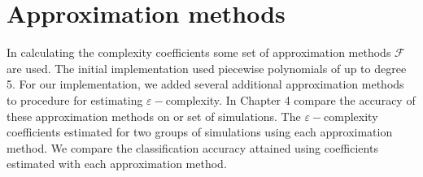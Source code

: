 
  



\section{Approximation methods}

In calculating the complexity coefficients some set 
of approximation methods $\mathcal{F}$ are used.
The initial implementation used piecewise polynomials of
up to degree 5. 
For our implementation, we added several additional 
approximation methods to procedure for 
estimating $\varepsilon-$complexity. 
In Chapter 4 compare the accuracy of these 
approximation methods on or set of simulations.
The $\varepsilon-$complexity coefficients estimated
for two groups of simulations using each approximation
method. We compare the classification accuracy attained 
using coefficients estimated with 
each approximation method.

